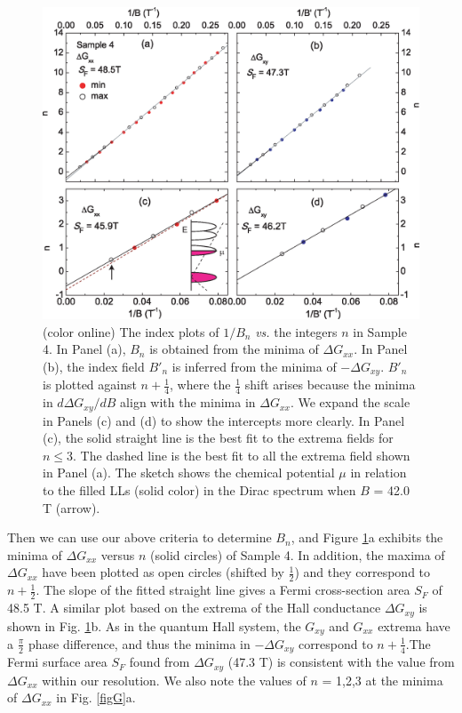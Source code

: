 \begin{figure}[!htbp]
  \begin{center}
\includegraphics[width=0.9\linewidth]{ch-bts/figures/FigIndexAll4.eps}
\caption{\label{figindex} (color online)
The index plots of $1/B_n$ \emph{vs.} the integers $n$ in Sample 4. In Panel (a), $B_n$ is obtained from
the minima of $\Delta G_{xx}$. In Panel (b), the index field $B'_n$ is inferred from the minima of
$-\Delta G_{xy}$. $B'_n$ is plotted against $n+\frac14$, where the $\frac14$ shift arises because 
the minima in $d\Delta G_{xy}/dB$
align with the minima in $\Delta G_{xx}$. We expand the scale in Panels (c) and (d) to
show the intercepts more clearly. 
In Panel (c), the solid straight line is the best fit to the extrema fields for $n\le$3. The
dashed line is the best fit to all the extrema field shown in Panel (a).
The sketch shows the chemical potential $\mu$ in relation to the filled LLs (solid color) in the Dirac spectrum when
$B$ = 42.0 T (arrow). 
}
  \end{center}
\end{figure}


Then we can use our above criteria to determine $B_n$, and Figure \ref{figindex}a exhibits the minima 
of $\Delta G_{xx}$ versus $n$ (solid circles) of Sample 4. In addition, the maxima of $\Delta G_{xx}$ have been plotted as open circles (shifted by $\frac12$) and they correspond to $n+\frac12$. The slope of the fitted straight line gives a Fermi cross-section area $S_F$ of 48.5 T.
A similar plot based on the extrema of the Hall conductance $\Delta G_{xy}$ 
is shown in Fig. \ref{figindex}b. As in the quantum Hall system, the $G_{xy}$ and $G_{xx}$ extrema have a $\frac{\pi}{2}$ phase difference, and thus the minima in $-\Delta G_{xy}$ correspond to $n+\frac14$.The Fermi surface area $S_F$ found from $\Delta G_{xy}$ (47.3 T) is consistent with the value from  $\Delta G_{xx}$ within our resolution. We also note the values of $n$ = 1,2,3 at the minima of $\Delta G_{xx}$ in Fig. \ref{figG}a.


